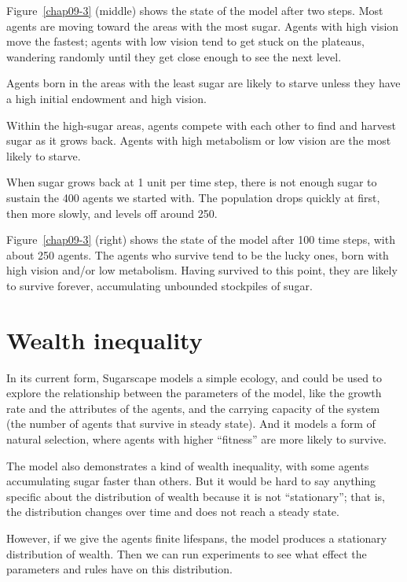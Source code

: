 \documentclass[12pt]{book}
\theoremstyle{exercise}
\begin{document}
Figure~\ref{chap09-3} (middle) shows the state of the model after two
steps.  Most agents are moving toward the areas with the most sugar.
Agents with high vision move the fastest; agents with low vision
tend to get stuck on the plateaus, wandering randomly until they get
close enough to see the next level.

Agents born in the areas with the least sugar are likely to starve
unless they have a high initial endowment and high vision.

Within the high-sugar areas, agents compete with each other to
find and harvest sugar as it grows back.  Agents with high metabolism
or low vision are the most likely to starve.

When sugar grows back at 1 unit per time step, there is not enough
sugar to sustain the 400 agents we started with.  The population
drops quickly at first, then more slowly, and levels off around 250.

Figure~\ref{chap09-3} (right) shows the state of the model after 100
time steps, with about 250 agents.  The agents who survive tend to
be the lucky ones, born with high vision and/or low metabolism.
Having survived to this point, they are likely to survive forever,
accumulating unbounded stockpiles of sugar.


\section{Wealth inequality}

In its current form, Sugarscape models a simple ecology, and could
be used to explore the relationship between the parameters of the
model, like the growth rate and the attributes of the agents, and
the carrying capacity of the system (the number of agents that
survive in steady state).  And it models a form of natural selection,
where agents with higher ``fitness'' are more likely to survive.


The model also demonstrates a kind of wealth inequality, with some
agents accumulating sugar faster than others.  But it would be hard
to say anything specific about the distribution of wealth because it
is not ``stationary''; that is, the distribution changes over time and
does not reach a steady state.


However, if we give the agents finite lifespans, the model produces
a stationary distribution of wealth.  Then we can run experiments to
see what effect the parameters and rules have on this distribution.
\end{document}
